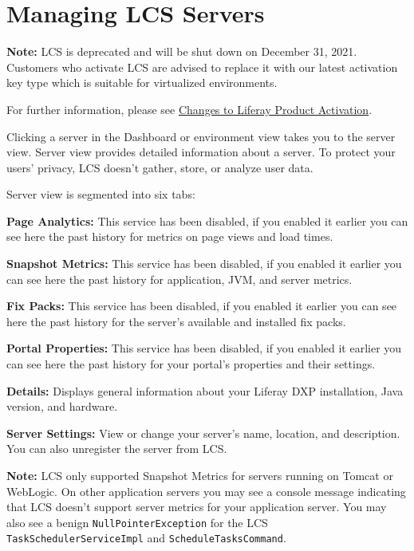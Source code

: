 \chapter{Managing LCS Servers}\label{managing-lcs-servers}

\noindent\hrulefill

\textbf{Note:} LCS is deprecated and will be shut down on December 31,
2021. Customers who activate LCS are advised to replace it with our
latest activation key type which is suitable for virtualized
environments.

For further information, please see
\href{https://help.liferay.com/hc/en-us/articles/4402347960845-Changes-to-Liferay-Product-Activation}{Changes
to Liferay Product Activation}.

\noindent\hrulefill

Clicking a server in the Dashboard or environment view takes you to the
server view. Server view provides detailed information about a server.
To protect your users' privacy, LCS doesn't gather, store, or analyze
user data.

Server view is segmented into six tabs:

\textbf{Page Analytics:} This service has been disabled, if you enabled
it earlier you can see here the past history for metrics on page views
and load times.

\textbf{Snapshot Metrics:} This service has been disabled, if you
enabled it earlier you can see here the past history for application,
JVM, and server metrics.

\textbf{Fix Packs:} This service has been disabled, if you enabled it
earlier you can see here the past history for the server's available and
installed fix packs.

\textbf{Portal Properties:} This service has been disabled, if you
enabled it earlier you can see here the past history for your portal's
properties and their settings.

\textbf{Details:} Displays general information about your Liferay DXP
installation, Java version, and hardware.

\textbf{Server Settings:} View or change your server's name, location,
and description. You can also unregister the server from LCS.

\noindent\hrulefill

\textbf{Note:} LCS only supported Snapshot Metrics for servers running
on Tomcat or WebLogic. On other application servers you may see a
console message indicating that LCS doesn't support server metrics for
your application server. You may also see a benign
\texttt{NullPointerException} for the LCS
\texttt{TaskSchedulerServiceImpl} and \texttt{ScheduleTasksCommand}.

